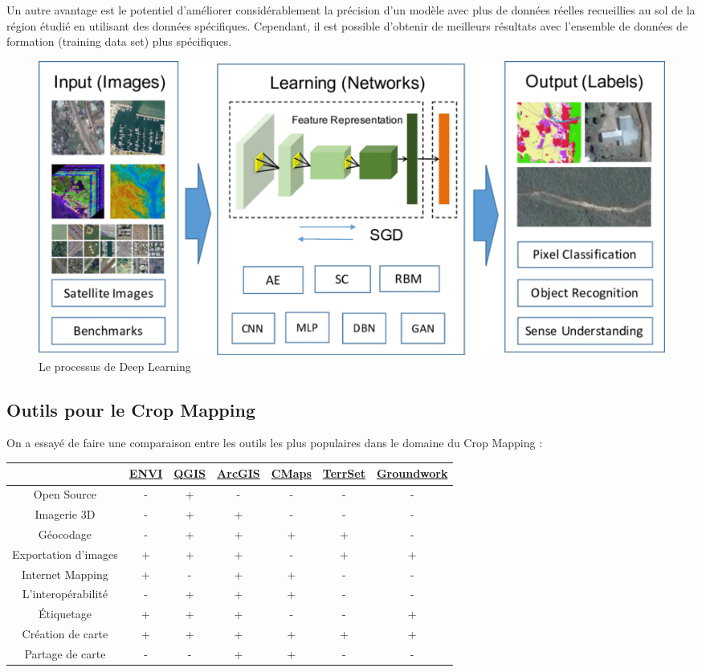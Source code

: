 \documentclass[12pt, openany]{report}
\begin{document}
Un autre avantage est le potentiel d'améliorer considérablement la précision d'un modèle avec plus de données réelles recueillies au sol de la région étudié en utilisant des données spécifiques. Cependant, il est possible d'obtenir de meilleurs résultats avec l'ensemble de données de formation (training data set) plus spécifiques.

\begin{figure}[H]
\centering
\includegraphics[scale=0.5]{deep.png}
\caption{Le processus de Deep Learning}
\end{figure}

\subsection{Outils pour le Crop Mapping}

On a essayé de faire une comparaison entre les outils les plus populaires dans le domaine du Crop Mapping :

{\setlength{\tabulinesep}{3pt}
\begin{tabu}{|c|c|c|c|c|c|c|}
\hline
{}&\href{https://www.harrisgeospatial.com/Software-Technology/ENVI}{ENVI}&\href{https://groundwork.azavea.com}{QGIS}&\href{https://www.arcgis.com/index.html}{ArcGIS}&\href{https://cmapsconnect.com/}{CMaps}&\href{https://clarklabs.org/terrset/}{TerrSet}&\href{https://groundwork.azavea.com/}{Groundwork}\\
\hline
Open Source & - & + & - & - & - & -\\
\hline
Imagerie 3D & - & + & + & - & - & -\\
\hline
Géocodage & - & + & + & + & + & -\\
\hline
Exportation d'images & + & + & + & - & + & +\\
\hline
Internet Mapping & + & - & + & + & - & -\\
\hline
L'interopérabilité & - & + & + & + & - & -\\
\hline
Étiquetage & + & + & + & - & - & +\\
\hline
Création de carte & + & + & + & + & + & +\\
\hline
Partage de carte & - & - & + & + & - & -\\
\hline
\end{tabu}}\\
\end{document}
